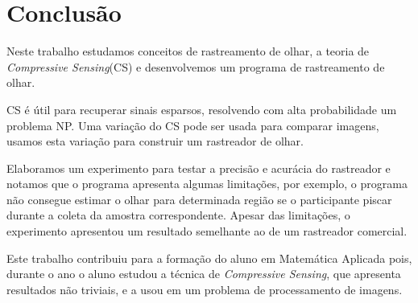 \chapter{Conclusão}

Neste trabalho estudamos conceitos de rastreamento de olhar, a teoria de \textit{Compressive Sensing}(CS) e desenvolvemos um programa de rastreamento de olhar.


CS é útil para recuperar sinais esparsos, resolvendo com alta probabilidade um problema NP. Uma variação do CS pode ser usada para comparar imagens, usamos esta variação para construir um rastreador de olhar.

Elaboramos um experimento para testar a precisão e acurácia do rastreador e notamos que o programa apresenta algumas limitações, por exemplo, o programa não consegue estimar o olhar para determinada região se o participante piscar durante a coleta da amostra correspondente. Apesar das limitações, o experimento apresentou um resultado semelhante ao de um rastreador comercial.

Este trabalho contribuiu para a formação do aluno em Matemática Aplicada pois, durante o ano o aluno estudou a técnica de \textit{Compressive Sensing}, que apresenta resultados não triviais, e a usou em um problema de processamento de imagens.
